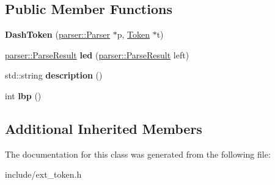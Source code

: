 \subsection*{Public Member Functions}
\begin{DoxyCompactItemize}
\item 
{\bfseries Dash\+Token} (\hyperlink{classfcal_1_1parser_1_1Parser}{parser\+::\+Parser} $\ast$p, \hyperlink{classfcal_1_1scanner_1_1Token}{Token} $\ast$t)\hypertarget{classfcal_1_1scanner_1_1DashToken_afaabbf1a78e35a4592cd8a5e1bfab79f}{}\label{classfcal_1_1scanner_1_1DashToken_afaabbf1a78e35a4592cd8a5e1bfab79f}

\item 
\hyperlink{classfcal_1_1parser_1_1ParseResult}{parser\+::\+Parse\+Result} {\bfseries led} (\hyperlink{classfcal_1_1parser_1_1ParseResult}{parser\+::\+Parse\+Result} left)\hypertarget{classfcal_1_1scanner_1_1DashToken_a7c0e98c83937cf698ce6f32380e17c52}{}\label{classfcal_1_1scanner_1_1DashToken_a7c0e98c83937cf698ce6f32380e17c52}

\item 
std\+::string {\bfseries description} ()\hypertarget{classfcal_1_1scanner_1_1DashToken_a87476e28739d1c9966ed330ba8154342}{}\label{classfcal_1_1scanner_1_1DashToken_a87476e28739d1c9966ed330ba8154342}

\item 
int {\bfseries lbp} ()\hypertarget{classfcal_1_1scanner_1_1DashToken_a1b88432765ae6c30be1250015ebaa2c4}{}\label{classfcal_1_1scanner_1_1DashToken_a1b88432765ae6c30be1250015ebaa2c4}

\end{DoxyCompactItemize}
\subsection*{Additional Inherited Members}


The documentation for this class was generated from the following file\+:\begin{DoxyCompactItemize}
\item 
include/ext\+\_\+token.\+h\end{DoxyCompactItemize}

